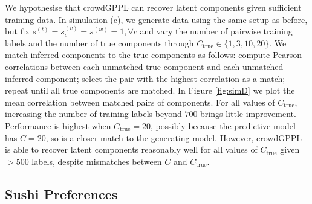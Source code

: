We hypothesise that crowdGPPL can recover latent components given sufficient training data.
In simulation (c), we generate data using the same setup as before, 
but fix $s^{(t)} = s^{(v)}_c = s^{(w)} = 1,\forall c$
and vary the number of pairwise training labels 
and the number of true components through
$C_{\mathrm{true}} \in \{ 1, 3, 10, 20\}$.
We match inferred components to the true components as follows:
compute Pearson correlations between each unmatched true component and 
each unmatched inferred component;
select the pair with the highest correlation as a match;
repeat until all true components are matched.
In Figure \ref{fig:simD} we plot the mean correlation between matched pairs of components.
For all values of $C_{\mathrm{true}}$, increasing the
number of training labels beyond $700$ brings little improvement. 
Performance is highest when $C_{\mathrm{true}} = 20$,
possibly because the predictive model has $C = 20$,
so is a closer match to the generating model.
However, %
crowdGPPL is able to recover latent components reasonably well for all
values of $C_{\mathrm{true}}$ given $>500$ labels, despite mismatches between $C$ and $C_{\mathrm{true}}$.


\subsection{Sushi Preferences}\label{sec:sushi}

